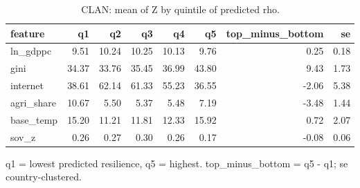\begin{table}[htbp]
\centering
\caption{CLAN: mean of Z by quintile of predicted rho.}
\label{tab:clan}
\begin{tabular}{lrrrrrrr}
\toprule
feature & q1 & q2 & q3 & q4 & q5 & top\_minus\_bottom & se \\
\midrule
ln\_gdppc & 9.51 & 10.24 & 10.25 & 10.13 & 9.76 & 0.25 & 0.18 \\
gini & 34.37 & 33.76 & 35.45 & 36.99 & 43.80 & 9.43 & 1.73 \\
internet & 38.61 & 62.14 & 61.33 & 55.23 & 36.55 & -2.06 & 5.38 \\
agri\_share & 10.67 & 5.50 & 5.37 & 5.48 & 7.19 & -3.48 & 1.44 \\
base\_temp & 15.20 & 11.21 & 11.81 & 12.33 & 15.92 & 0.72 & 2.07 \\
sov\_z & 0.26 & 0.27 & 0.30 & 0.26 & 0.17 & -0.08 & 0.06 \\
\bottomrule
\end{tabular}
\par\smallskip\footnotesize q1 = lowest predicted resilience, q5 = highest. top\_minus\_bottom = q5 - q1; se country-clustered.
\end{table}
